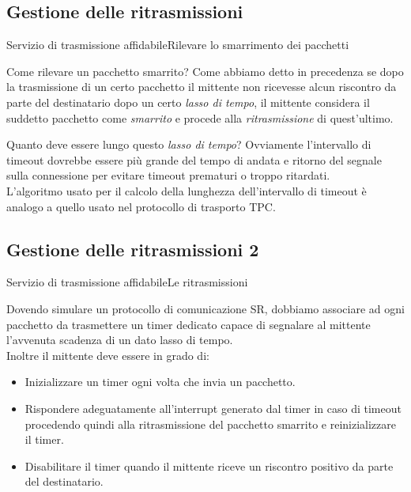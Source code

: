 \documentclass[10pt]{beamer}
\begin{document}
\subsection{Gestione delle ritrasmissioni}
\begin{frame}[fragile]{Servizio di trasmissione affidabile}{Rilevare lo smarrimento dei pacchetti}

\begin{block}{Come rilevare un pacchetto smarrito?}
Come abbiamo detto in precedenza se dopo la trasmissione di un certo pacchetto il mittente non ricevesse alcun riscontro da parte del destinatario dopo un certo \textit{lasso di tempo}, il mittente considera il suddetto pacchetto come \textit{smarrito} e procede alla \textit{ritrasmissione} di quest'ultimo. 
\end{block}

\vspace*{10px}

\begin{block}{Quanto deve essere lungo questo \textit{lasso di tempo}?}
Ovviamente l'intervallo di timeout dovrebbe essere più grande del tempo di andata e ritorno del segnale sulla connessione per evitare timeout prematuri o troppo ritardati. \\ L'algoritmo usato per il calcolo della lunghezza dell'intervallo di timeout è analogo a quello usato nel protocollo di trasporto TPC.
\end{block}

\end{frame}

\subsection{Gestione delle ritrasmissioni 2}
\begin{frame}[fragile]{Servizio di trasmissione affidabile}{Le ritrasmissioni}

Dovendo simulare un protocollo di comunicazione SR, dobbiamo associare ad ogni pacchetto da trasmettere un timer dedicato capace di segnalare al mittente l'avvenuta scadenza di un dato lasso di tempo. \\
\vspace*{10px}
Inoltre il mittente deve essere in grado di:

\begin{itemize}
\item Inizializzare un timer ogni volta che invia un pacchetto.
\item Rispondere adeguatamente all'interrupt generato dal timer in caso di timeout procedendo quindi alla ritrasmissione del pacchetto smarrito e reinizializzare il timer.
\item Disabilitare il timer quando il mittente riceve un riscontro positivo da parte del destinatario.
\end{itemize} 

\end{frame}
\end{document}
